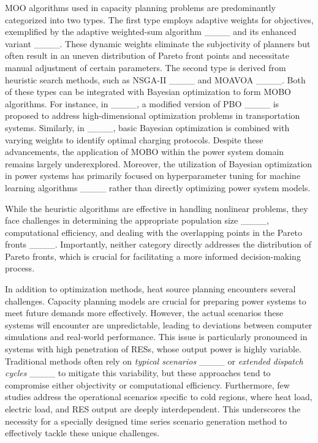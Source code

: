 MOO algorithms used in capacity planning problems are predominantly categorized into two types. The first type employs adaptive weights for objectives, exemplified by the adaptive weighted-sum algorithm ____ and its enhanced variant ____. These dynamic weights eliminate the subjectivity of planners but often result in an uneven distribution of Pareto front points and necessitate manual adjustment of certain parameters. The second type is derived from heuristic search methods, such as NSGA-II ____ and MOAVOA ____.
\textcolor{revise_blue}{
        Both of these types can be integrated with Bayesian optimization to form MOBO algorithms. For instance, in ____, a modified version of PBO  ____ is proposed to address high-dimensional optimization problems in transportation systems. Similarly, in  ____, basic Bayesian optimization is combined with varying weights to identify optimal charging protocols.
        Despite these advancements, the application of MOBO within the power system domain remains largely underexplored. Moreover, the utilization of Bayesian optimization in power systems has primarily focused on hyperparameter tuning for machine learning algorithms ____ rather than directly optimizing power system models.
    }

While the heuristic algorithms are effective in handling nonlinear problems, they face challenges in determining the appropriate population size ____, computational efficiency, and dealing with the overlapping points in the Pareto fronts ____. Importantly, neither category directly addresses the distribution of Pareto fronts, which is crucial for facilitating a more informed decision-making process.

In addition to optimization methods, heat source planning encounters several challenges. Capacity planning models are crucial for preparing power systems to meet future demands more effectively. However, the actual scenarios these systems will encounter are unpredictable, leading to deviations between computer simulations and real-world performance. This issue is particularly pronounced in systems with high penetration of RESs, whose output power is highly variable. Traditional methods often rely on \textit{typical scenarios} ____ or \textit{extended dispatch cycles} ____ to mitigate this variability, but these approaches tend to compromise either objectivity or computational efficiency. Furthermore, few studies address the operational scenarios specific to cold regions, where heat load, electric load, and RES output are deeply interdependent. This underscores the necessity for a specially designed time series scenario generation method to effectively tackle these unique challenges.

